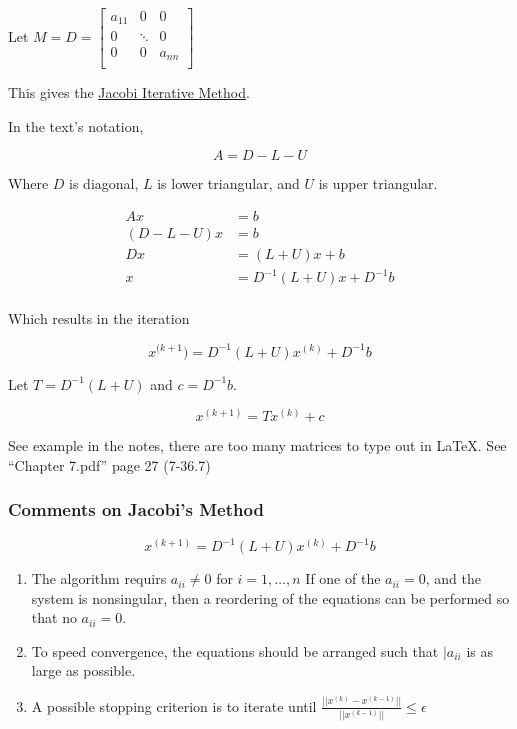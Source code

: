 \ex Let $M=D=\begin{bmatrix}
  a_{11} & 0 & 0\\
0 & \ddots & 0\\
0 & 0 & a_{nn}\\
\end{bmatrix}$

This gives the \uline{Jacobi Iterative Method}.

In the text's notation,

\begin{equation*}
  A=D-L-U
\end{equation*}

Where $D$ is diagonal, $L$ is lower triangular, and $U$ is upper triangular.

\begin{align*}
  Ax &= b \\
  (D-L-U)x &= b \\
  Dx &= (L+U)x + b\\
  x &= D^{-1}(L+U)x +D^{-1}b \\
\end{align*}

Which results in the iteration 

\begin{equation*}
  x^{(k+1}) = D^{-1}(L+U)x^{(k)} + D^{-1}b
\end{equation*}

Let $T=D^{-1}(L+U)$ and $c=D^{-1}b$.

\begin{equation*}
  x^{(k+1)} = Tx^{(k)} + c
\end{equation*}

See example in the notes, there are too many matrices to type out in LaTeX.
See \enquote{Chapter 7.pdf} page 27 (7-36.7)


\subsubsection{Comments on Jacobi's Method}

\begin{equation*}
  x^{(k+1)} = D^{-1}(L+U)x^{(k)} + D^{-1}b
\end{equation*}

\begin{enumerate}
  \item The algorithm requirs $a_{ii} \neq 0$ for $i=1,\dots,n$ If one of the 
    $a_{ii} = 0$, and the system is nonsingular, then a reordering of the 
    equations can be performed so that no $a_{ii} = 0$.
  \item To speed convergence, the equations should be arranged such that
    $|a_{ii}$ is as large as possible.
  \item A possible stopping criterion is to iterate until
    $\frac{||x^{(k)}-x^{(k-1)}||}{||x^{(k-1)}||} \leq \epsilon$
\end{enumerate}

